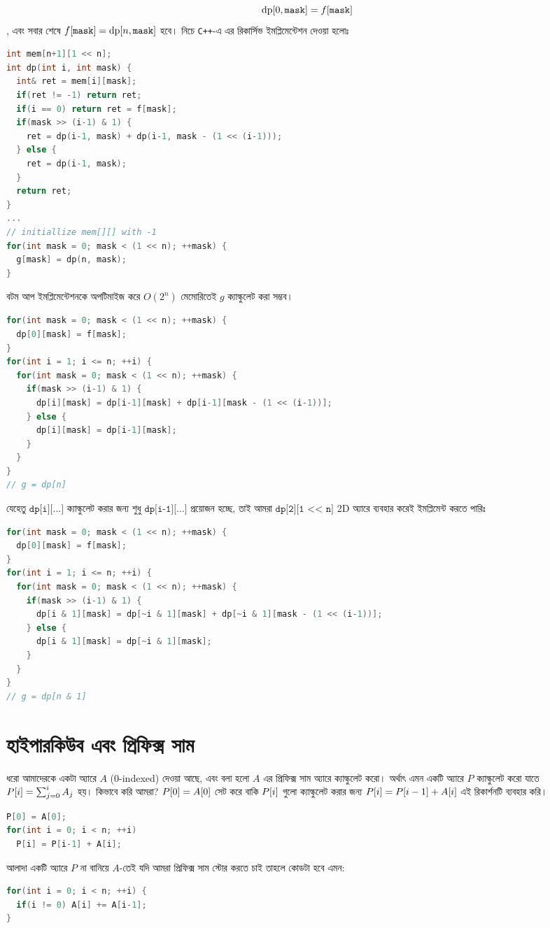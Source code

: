 \[
  \text{dp}[0, \mathtt{mask}] = f[\mathtt{mask}]
\], এবং সবার শেষে $f[\mathtt{mask}] = \text{dp}[n, \mathtt{mask}]$ হবে। নিচে \texttt{C++}-এ এর রিকার্সিভ ইমপ্লিমেন্টেশন দেওয়া হলোঃ
\begin{lstlisting}[language=C++]
int mem[n+1][1 << n];
int dp(int i, int mask) {
  int& ret = mem[i][mask];
  if(ret != -1) return ret;
  if(i == 0) return ret = f[mask];
  if(mask >> (i-1) & 1) {
    ret = dp(i-1, mask) + dp(i-1, mask - (1 << (i-1)));
  } else {
    ret = dp(i-1, mask);
  }
  return ret;
}
...
// initiallize mem[][] with -1
for(int mask = 0; mask < (1 << n); ++mask) {
  g[mask] = dp(n, mask);
}
\end{lstlisting}
বটম আপ ইমপ্লিমেন্টেশনকে অপটিমাইজ করে $O(2^n)$ মেমোরিতেই $g$ ক্যাল্কুলেট করা
সম্ভব।
\begin{lstlisting}[language=C++]
for(int mask = 0; mask < (1 << n); ++mask) {
  dp[0][mask] = f[mask];
}
for(int i = 1; i <= n; ++i) {
  for(int mask = 0; mask < (1 << n); ++mask) {
    if(mask >> (i-1) & 1) {
      dp[i][mask] = dp[i-1][mask] + dp[i-1][mask - (1 << (i-1))];
    } else {
      dp[i][mask] = dp[i-1][mask];
    }
  }
}
// g = dp[n]
\end{lstlisting}
যেহেতু $\texttt{dp[i][...]}$ ক্যাল্কুলেট করার জন্য শুধু
$\texttt{dp[i-1][...]}$ প্রয়োজন হচ্ছে, তাই আমরা $\texttt{dp[2][1 << n]}$ 2D
অ্যারে ব্যবহার করেই ইমপ্লিমেন্ট করতে পারিঃ
\begin{lstlisting}[language=C++]
for(int mask = 0; mask < (1 << n); ++mask) {
  dp[0][mask] = f[mask];
}
for(int i = 1; i <= n; ++i) {
  for(int mask = 0; mask < (1 << n); ++mask) {
    if(mask >> (i-1) & 1) {
      dp[i & 1][mask] = dp[~i & 1][mask] + dp[~i & 1][mask - (1 << (i-1))];
    } else {
      dp[i & 1][mask] = dp[~i & 1][mask];
    }
  }
}
// g = dp[n & 1]
\end{lstlisting}

\section{হাইপারকিউব এবং প্রিফিক্স সাম}
ধরো আমাদেরকে একটা অ্যারে $A$ (0-indexed) দেওয়া আছে, এবং বলা হলো $A$ এর
প্রিফিক্স সাম অ্যারে ক্যাল্কুলেট করো। অর্থাৎ এমন একটি অ্যারে $P$ ক্যাল্কুলেট
করো যাতে $P[i] = \sum_{j=0}^{i} A_j$ হয়। কিভাবে করি আমরা? $P[0] =
A[0]$ সেট করে বাকি $P[i]$ গুলো ক্যাল্কুলেট করার জন্য $P[i] =
P[i-1] + A[i]$ এই রিকার্শনটি ব্যবহার করি।
\begin{lstlisting}[language=C++]
P[0] = A[0];
for(int i = 0; i < n; ++i)
  P[i] = P[i-1] + A[i];
\end{lstlisting}
আলাদা একটি অ্যারে $P$ না বানিয়ে $A$-তেই যদি আমরা প্রিফিক্স সাম স্টোর করতে চাই
তাহলে কোডটা হবে এমন:
\begin{lstlisting}[language=C++]
for(int i = 0; i < n; ++i) {
  if(i != 0) A[i] += A[i-1];
}
\end{lstlisting}

